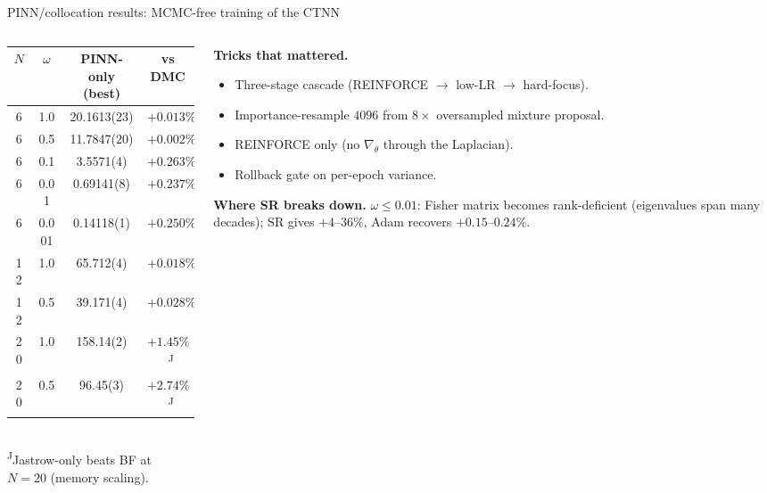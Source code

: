 \documentclass[10pt,aspectratio=169]{beamer}
\begin{document}
\begin{frame}{PINN/collocation results: MCMC-free training of the CTNN}
\small
\begin{columns}[T,onlytextwidth]
\begin{column}{0.56\textwidth}
\scriptsize
\begin{tabular}{cccc}
\toprule
$N$ & $\omega$ & PINN-only (best) & vs DMC \\
\midrule
6 & 1.0   & 20.1613(23)  & $+0.013\%$ \\
6 & 0.5   & 11.7847(20)  & $+0.002\%$ \\
6 & 0.1   & 3.5571(4)    & $+0.263\%$ \\
6 & 0.01  & 0.69141(8)   & $+0.237\%$ \\
6 & 0.001 & 0.14118(1)   & $+0.250\%$ \\
\midrule
12 & 1.0  & 65.712(4)    & $+0.018\%$ \\
12 & 0.5  & 39.171(4)    & $+0.028\%$ \\
\midrule
20 & 1.0  & 158.14(2)    & $+1.45\%$\ \textsuperscript{J} \\
20 & 0.5  & 96.45(3)     & $+2.74\%$\ \textsuperscript{J} \\
\bottomrule
\end{tabular}\\[2pt]
{\scriptsize \textsuperscript{J}Jastrow-only beats BF at $N{=}20$ (memory scaling).}
\end{column}
\begin{column}{0.42\textwidth}
\textbf{Tricks that mattered.}
\begin{itemize}\setlength\itemsep{1pt}\small
\item Three-stage cascade (REINFORCE $\to$ low-LR $\to$ hard-focus).
\item Importance-resample $4096$ from $8\times$ oversampled mixture proposal.
\item REINFORCE only (no $\nabla_\theta$ through the Laplacian).
\item Rollback gate on per-epoch variance.
\end{itemize}

\textbf{Where SR breaks down.} $\omega\le 0.01$: Fisher matrix becomes
rank-deficient (eigenvalues span many decades); SR gives $+4$--$36\%$, Adam recovers $+0.15$--$0.24\%$.
\end{column}
\end{columns}
\end{frame}
\end{document}
